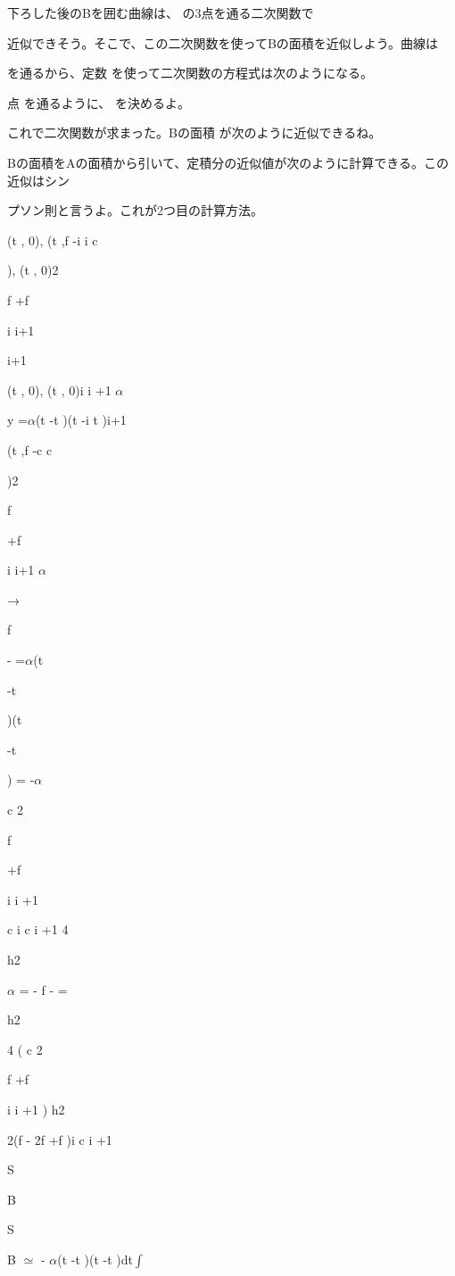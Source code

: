 下ろした後のBを囲む曲線は、 の3点を通る⼆次関数で\par
近似できそう。そこで、この⼆次関数を使ってBの⾯積を近似しよう。曲線は\par
を通るから、定数 を使って⼆次関数の⽅程式は次のようになる。\par
点 を通るように、 を決めるよ。\par
これで⼆次関数が求まった。Bの⾯積 が次のように近似できるね。\par
Bの⾯積をAの⾯積から引いて、定積分の近似値が次のように計算できる。この近似はシン\par
プソン則と⾔うよ。これが2つ⽬の計算⽅法。\par
(t  , 0), (t ,f  -i i c\par
), (t  , 0)2\par
f  +f\par
i i+1\par
i+1\par
(t  , 0), (t , 0)i i +1 $\alpha$\par
y =$\alpha$(t -t  )(t -i t  )i+1\par
(t  ,f  -c c\par
)2\par
f\par
+f\par
i i+1 $\alpha$\par
→\par
f\par
-  =$\alpha$(t\par
-t\par
)(t\par
-t\par
) = -$\alpha$\par
c 2\par
f\par
+f\par
i i +1\par
c i c i +1 4\par
h2\par
$\alpha$ = -  f  -  =\par
h2\par
4 ( c 2\par
f  +f\par
i i +1 ) h2\par
2(f  - 2f  +f  )i c i +1\par
S\par
B\par
S\par
B $\simeq$ -  $\alpha$(t -t  )(t -t )dt$\int$\par
